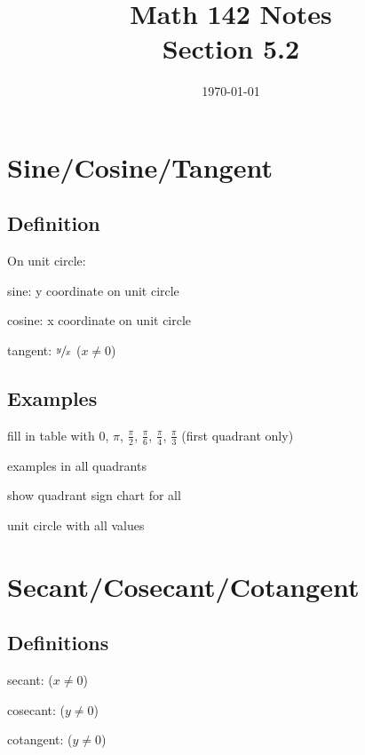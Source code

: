 \documentclass{exam}
\title{Math 142 Notes \\ Section 5.2}
\date{\today}
\begin{document}
  \maketitle
  \tableofcontents

  \section{Sine/Cosine/Tangent}

  \subsection{Definition}

  On unit circle:
  \begin{itemize*}
    \item sine: y coordinate on unit circle
    \item cosine: x coordinate on unit circle
    \item tangent: $\sfrac{y}{x}$ ($x \neq 0$)
  \end{itemize*}

  \subsection{Examples}

  \begin{itemize*}
    \item fill in table with 0, $\pi$, $\frac{\pi}{2}$, $\frac{\pi}{6}$, $\frac{\pi}{4}$, $\frac{\pi}{3}$ (first
      quadrant only)
    \item examples in all quadrants
    \item show quadrant sign chart for all
    \item unit circle with all values
  \end{itemize*}

  \section{Secant/Cosecant/Cotangent}
  \subsection{Definitions}
  \begin{itemize*}
    \item secant:  ($x \neq 0$)
    \item cosecant:  ($y \neq 0$)
    \item cotangent:  ($y \neq 0$)
  \end{itemize*}
\end{document}

